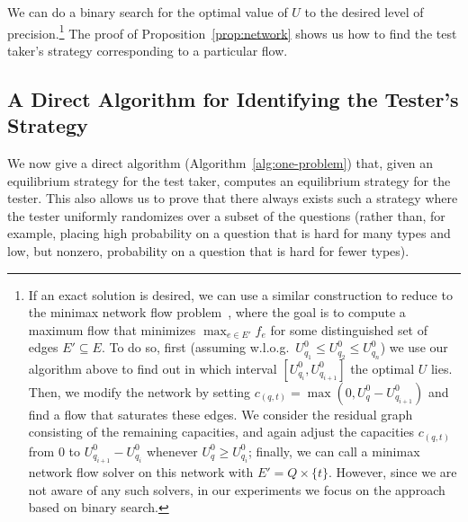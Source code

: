 \documentclass{article}
\begin{document}

We can do a binary search for the optimal value of $U$ to the desired level of
precision.\footnote{If an exact solution is desired, we can use a similar construction to
  reduce to the minimax network flow problem~\cite{???}, where the goal is
  to compute a maximum flow that minimizes $\max_{e \in
    E'} f_e$ for some distinguished set of edges $E' \subseteq E$.  To do
  so, first (assuming w.l.o.g.~$U_{q_1}^0 \leq U_{q_2}^0 \leq U_{q_n}^0$)
  we use our algorithm above to find out in which interval $[U_{q_i}^0,
  U_{q_{i+1}}^0]$ the optimal $U$ lies.  Then, we modify the network by
  setting $c_{(q, t)} = \max(0, U_q^0-U_{q_{i+1}}^0)$ and find a flow that
  saturates these edges.  We consider the residual graph consisting of the
  remaining capacities, and again adjust the capacities $c_{(q, t)}$ from
  $0$ to $U_{q_{i+1}}^0-U_{q_i}^0$ whenever $U_q^0 \geq U_{q_i}^0$;
  finally, we can call a minimax network flow solver on this network with
  $E' = Q \times \{t\}$.  However, since we are not aware of any such
  solvers, in our experiments we focus on the approach based on binary search.}
The proof of Proposition~\ref{prop:network} shows us how to find the 
 test taker's strategy corresponding to a particular flow.


\subsection{A Direct Algorithm for Identifying the Tester's Strategy}

We now give a direct algorithm (Algorithm~\ref{alg:one-problem}) that, given an equilibrium strategy for the
test taker, computes an equilibrium strategy for the tester.
This also allows us to prove that there always exists such a strategy where
the tester uniformly randomizes over a subset of the questions (rather
than, for example, placing high probability on a question that is hard for
many types and low, but nonzero, probability on a question that is hard for
fewer types).
\end{document}

